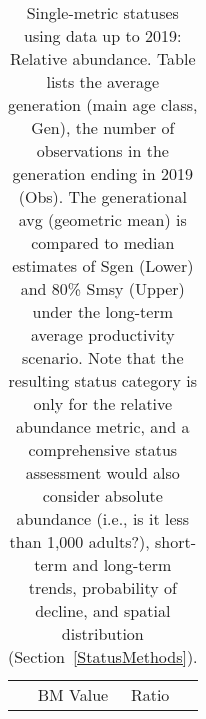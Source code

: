 \documentclass[french,11pt]{book}
\begin{document}
\begingroup\fontsize{9}{11}\selectfont \begingroup\fontsize{9}{11}\selectfont  
\begin{longtable}[t]{llrrrrrrrr} \caption{\label{tab:RelAbd2019}Single-metric statuses using data up to 2019: Relative abundance. Table lists the average generation (main age class, Gen), the number of observations in the generation ending in 2019 (Obs). The generational avg (geometric mean) is compared to median estimates of Sgen (Lower) and 80\% Smsy (Upper) under the long-term average productivity scenario. Note that the resulting status category is only for the relative abundance metric, and a comprehensive status assessment would also consider absolute abundance (i.e., is it less than 1,000 adults?), short-term and long-term trends, probability of decline, and spatial distribution (Section~\ref{StatusMethods}).}\\ \toprule
\multicolumn{5}{c}{ } & \multicolumn{2}{c}{BM Value} & \multicolumn{2}{c}{Ratio} & \multicolumn{1}{c}{ } \\

\end{longtable}
\end{document}
